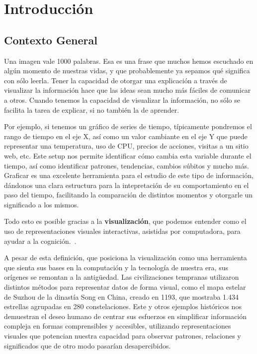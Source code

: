 \section{Introducción}
\subsection{Contexto General}

Una imagen vale 1000 palabras. Esa es una frase que muchos hemos escuchado en algún momento de nuestras vidas, y que probablemente ya sepamos qué significa con sólo leerla. Tener la capacidad de otorgar una explicación a través de visualizar la información hace que las ideas sean mucho más fáciles de comunicar a otros. Cuando tenemos la capacidad de visualizar la información, no sólo se facilita la tarea de explicar, si no también la de aprender.

Por ejemplo, si tenemos un gráfico de series de tiempo, típicamente pondremos el rango de tiempo en el eje X, así como un valor cambiante en el eje Y que puede representar una temperatura, uso de CPU, precios de acciones, visitas a un sitio web, etc. Este setup nos permite identificar cómo cambia esta variable durante el tiempo, así como identificar patrones, tendencias, cambios súbitos y mucho más. Graficar es una excelente herramienta para el estudio de este tipo de información, dándonos una clara estructura para la intepretación de su comportamiento en el paso del tiempo, facilitando la comparación de distintos momentos y otorgarle un significado a los mismos. 

Todo esto es posible gracias a la \textbf{visualización}, que podemos entender como el uso de representaciones visuales interactivas, asistidas por computadora, para ayudar a la cognición.~\cite{card1999readings}.

A pesar de esta definición, que posiciona la visualización como una herramienta que sienta sus bases en la computación y la tecnología de nuestra era, sus orígenes se remontan a la antigüedad. Las civilizaciones tempranas utilizaron distintos métodos para representar datos de forma visual, como el mapa estelar de Suzhou de la dinastía Song en China, creado en 1193, que mostraba 1.434 estrellas agrupadas en 280 constelaciones. Este y otros ejemplos históricos nos demuestran el deseo humano de centrar sus esfuerzos en simplificar información compleja en formas comprensibles y accesibles, utilizando representaciones visuales que potencian nuestra capacidad para observar patrones, relaciones y significados que de otro modo pasarían desapercibidos.


